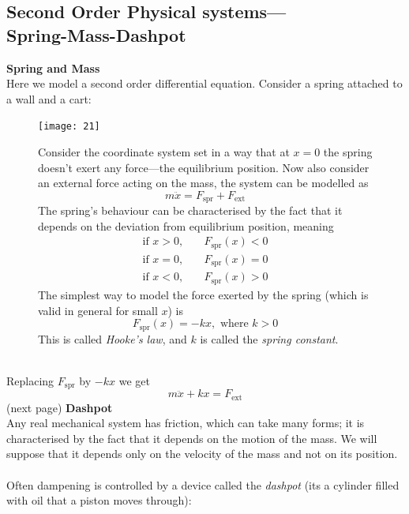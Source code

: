 \documentclass{report}
\begin{document}
\subsection{Second Order Physical systems---\\Spring-Mass-Dashpot}
\textbf{Spring and Mass}\\
Here we model a second order differential equation. Consider a spring attached to a wall and a cart:
\begin{figure}[h]
\begin{center}
\texttt{[image: 21]}\\
\end{center}
Consider the coordinate system set in a way that at $x=0$ the spring doesn't exert any force---the equilibrium 
position. Now also consider an external force acting on the mass, the system can be modelled as
\begin{equation*}
m\ddot{x}=F_\text{spr}+F_\text{ext}
\end{equation*}
The spring's behaviour can be characterised by the fact that it depends on the deviation from equilibrium position,
meaning
\begin{align*}
\text{if }x>0,\quad&F_\text{spr}(x)<0\\
\text{if }x=0,\quad&F_\text{spr}(x)=0\\
\text{if }x<0,\quad&F_\text{spr}(x)>0
\end{align*}
The simplest way to model the force exerted by the spring (which is valid in general for small $x$) is
\begin{equation*}
F_\text{spr}(x)=-kx,\text{ where }k>0
\end{equation*}
This is called \textit{Hooke's law}, and $k$ is called the \textit{spring constant}.
\end{figure}\\
Replacing $F_\text{spr}$ by $-kx$ we get
\begin{equation*}
m\ddot{x}+kx=F_\text{ext}
\end{equation*}
(next page)
\newpage
\noindent\textbf{Dashpot}\\
Any real mechanical system has friction, which can take many forms; it is characterised by the fact that it
depends on the motion of the mass. We will suppose that
it depends only on the velocity of the mass and not on its
position.\\
\vspace{1mm}\\
Often dampening is controlled by a device called
the \textit{dashpot} (its a cylinder filled with oil that a piston moves through):
\end{document}
